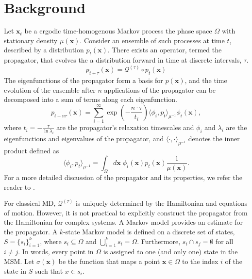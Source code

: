 \documentclass[journal=jpcbfk, layout=traditional, manuscript=article]{achemso}
\begin{document}
\section{Background}
Let $\mathbf{x}_t$ be a ergodic time-homogenous Markov process the phase space $\Omega$ with stationary density $\mu(\mathbf{x})$. Consider an ensemble of such processes at time $t$, described by a distribution $p_t(\mathbf{x})$. There exists an operator, termed the propagator, that evolves the a distribution forward in time at discrete intervals, $\tau$.
\begin{equation}
p_{t+\tau}(\mathbf{x}) = \mathcal{Q}^{(\tau)} \circ p_{t}(\mathbf{x})
\end{equation}
The eigenfunctions of the propagator form a basis for $p(\mathbf{x})$, and the time evolution of the ensemble after $n$ applications of the propagator can be decomposed into a sum of terms along each eigenfunction.
\begin{equation}
\label{eq:prop-timescales}
p_{t+n\tau}(\mathbf{x}) = \sum_{i=1}^\infty \exp\left(-\frac{n \cdot \tau}{t_i}\right) \langle \phi_i, p_t \rangle_{\mu^{-1}} \phi_i(\mathbf{x}),
\end{equation}
where $t_i = -\displaystyle\frac{\tau}{\ln \lambda_i}$ are the propagator's relaxation timescales and $\phi_i$ and $\lambda_i$ are the eigenfunctions and eigenvalues of the propagator, and $\langle \cdot, \cdot \rangle_{\mu^{-1}}$ denotes the inner product defined as
\begin{equation}
\langle \phi_i, p_t \rangle_{\mu^{-1}} = \int_\Omega d\mathbf{x}\; \phi_i(\mathbf{x}) p_t(\mathbf{x}) \frac{1}{\mu(\mathbf{x})}.
\end{equation}
For a more detailed discussion of the propagator and its properties, we refer the reader to \citet{Prinz2011Generation}.

For classical MD, $\mathcal{Q}^{(\tau)}$ is uniquely determined by the Hamiltonian and equations of motion\cite{}. However, it is not practical to explicitly construct the propagator from the Hamiltonian for complex systems. A Markov model provides an estimate for the propagator. A $k$-state Markov model is defined on a discrete set of states, $S = \{s_i\}_{i=1}^k$, where $s_i \subseteq \Omega$ and $\bigcup_{i=1}^k s_i = \Omega$. Furthermore, $s_i \cap s_j = \emptyset$ for all $i \neq j$. In words, every point in $\Omega$ is assigned to one (and only one) state in the MSM. Let $\sigma(\mathbf{x})$ be the function that maps a point $\mathbf{x} \in \Omega$ to the index $i$ of the state in $S$ such that $x \in s_i$.
\end{document}
